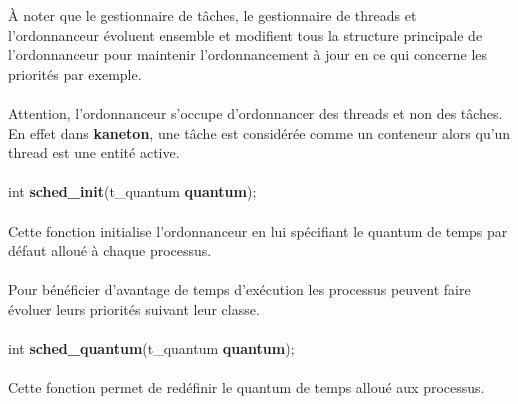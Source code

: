 \documentclass[10pt,a4wide]{article}
\begin{document}
\`A noter que le gestionnaire de t\^aches, le gestionnaire de threads et
l'ordonnanceur \'evoluent ensemble et modifient tous la structure principale
de l'ordonnanceur pour maintenir l'ordonnancement \`a jour en ce qui
concerne les priorit\'es par exemple.

\paragraph{}

Attention, l'ordonnanceur s'occupe d'ordonnancer des threads et non
des t\^aches. En effet dans \textbf{kaneton}, une t\^ache est consid\'er\'ee
comme un conteneur alors qu'un thread est une entit\'e active.

\paragraph{}

\hspace{1.5cm}int \textbf{sched\_init}(t\_quantum \textbf{quantum});

\paragraph{}

Cette fonction initialise l'ordonnanceur en lui sp\'ecifiant le quantum
de temps par d\'efaut allou\'e \`a chaque processus.

\paragraph{}

Pour b\'en\'eficier d'avantage de temps d'ex\'ecution les processus
peuvent faire \'evoluer leurs priorit\'es suivant leur classe.

\paragraph{}

\hspace{1.5cm}int \textbf{sched\_quantum}(t\_quantum \textbf{quantum});

\paragraph{}

Cette fonction permet de red\'efinir le quantum de temps allou\'e
aux processus.

\paragraph{}
\end{document}
